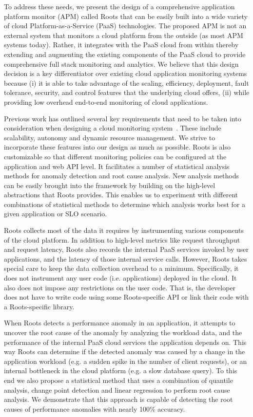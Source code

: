 To address these needs, we present the design of 
a comprehensive application platform 
monitor (APM) called Roots that can be easily built into a wide variety of cloud Platform-as-a-Service 
(PaaS) technologies. The proposed
APM is not an external system that monitors a cloud platform from the outside (as most APM systems today). 
Rather, it integrates with
the PaaS cloud from within thereby extending and augmenting the existing components of the PaaS cloud
to provide comprehensive full stack monitoring and analytics. 
We believe that this design decision is a key differentiator over existing cloud 
application monitoring systems because (i) it is
able to take advantage of the scaling, efficiency, deployment, fault tolerance, security, 
and control features that the underlying cloud offers, 
(ii) while providing low overhead end-to-end monitoring of cloud applications.

Previous work has outlined several key requirements that need to be taken into consideration when
designing a cloud monitoring system~\cite{DaCunhaRodrigues:2016:MCC:2851613.2851619,Ibidunmoye:2015:PAD:2808687.2791120}. 
These include scalability, autonomy and dynamic resource management. We strive to incorporate
these features into our design as much as possible.
Roots is also customizable so that different monitoring policies can be
configured at the application and web API level. It facilitates a number of statistical analysis
methods for anomaly detection and root cause analysis. New analysis methods
can be easily brought into the framework by building on the high-level abstractions
that Roots provides. This enables us to experiment with different combinations of
statistical methods to determine which analysis works best for a given application or
SLO scenario. 

Roots collects most of the data it requires by instrumenting 
various components of the cloud platform. In addition to high-level metrics like request throughput
and request latency, Roots also records the internal PaaS services invoked by user applications,
and the latency of those internal service calls. However, Roots takes special care to keep the data
collection overhead to a minimum. Specifically, it does not instrument any user code (i.e. applications)
deployed in the cloud. It also does not impose any restrictions on the user code.
That is, the developer does not have to write code using some Roots-specific API or link their
code with a Roots-specific library.

When Roots detects a performance anomaly in an application, it attempts to uncover the
root cause of the anomaly by analyzing the workload data,
and the performance of the internal PaaS cloud services the application depends on. 
This way Roots can determine if the detected anomaly was caused by a change in the
application workload (e.g. a sudden spike in the number of client requests), or an internal
bottleneck in the cloud platform (e.g. a slow database query). To this end we also propose
a statistical method that uses a combination of quantile analysis, change point detection
and linear regression to perform root cause analysis. We demonstrate that this approach is
capable of detecting the root causes of performance anomalies with nearly 100\% accuracy. 


